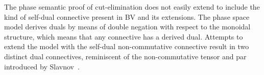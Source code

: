 The phase semantic proof of cut-elimination does not easily extend to include the kind of self-dual connective present in BV and its extensions.
The phase space model derives duals by means of double negation with respect to the monoidal structure, which means that any connective has a derived dual. Attempts to extend the model with the self-dual non-commutative connective result in two distinct dual connectives, reminiscent of the non-commutative tensor and par introduced by Slavnov~\cite{Slavnov19:scmll}.

